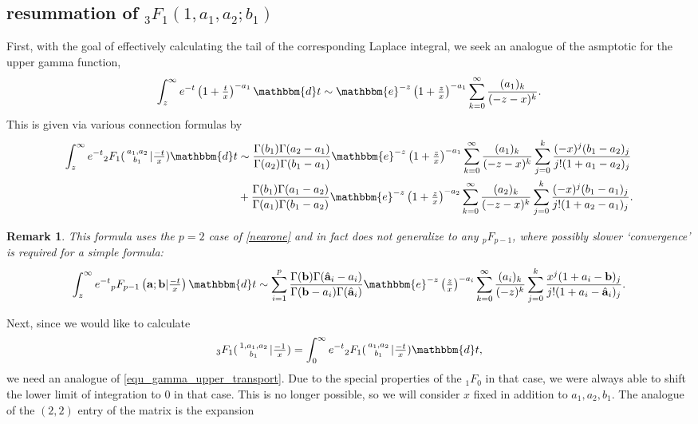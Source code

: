 \documentclass[12pt]{article}
\newcommand{\ee}[0] {\mathbbm{e}}
\newcommand{\dd}[0] {\mathbbm{d}}
\numberwithin{equation}{section}
\newtheorem{remark}[theorem]{Remark}
\newcommand{\FFs}[6] {{}_{#1}{#2}_{#3} ( \begin{smallmatrix} #4 \\ #5 \end{smallmatrix} | {#6}  )}
\newcommand{\FFf}[5] {{}_{#1}{#2}_{#3} \left(#4 | {#5} \right)}
\newcommand{\bfa}[0] {\mathbf{a}}
\newcommand{\bfb}[0] {\mathbf{b}}
\begin{document}
\subsection{resummation of ${}_3 F_1(1,a_1,a_2;b_1)$}
First, with the goal of effectively calculating the tail of the corresponding Laplace integral, we seek an analogue of the asmptotic for the upper gamma function,
\begin{equation*}
\int_{z}^{\infty} e^{-t} \left(1+\tfrac{t}{x}\right)^{-a_1} \dd t \sim \ee^{-z} \left(1+\tfrac{z}{x}\right)^{-a_1} \sum_{k=0}^{\infty} \frac{(a_1)_k}{(-z-x)^k} \text{.}
\end{equation*}
This is given via various connection formulas by
\begin{equation}
\label{equ_3f1_int_tail}
\begin{alignedat}{3}
\int_{z}^{\infty} e^{-t} \FFs{2}{F}{1}{a_1,a_2}{b_1}{\tfrac{-t}{x}} \dd t &\sim \frac{\Gamma(b_1)\Gamma(a_2-a_1)}{\Gamma(a_2)\Gamma(b_1-a_1)}\ee^{-z} \left(1+\tfrac{z}{x}\right)^{-a_1} \sum_{k=0}^{\infty} \frac{(a_1)_k}{(-z-x)^k} \sum_{j=0}^{k} \frac{(-x)^j(b_1-a_2)_j}{j!(1+a_1-a_2)_j}\\
&+\frac{\Gamma(b_1)\Gamma(a_1-a_2)}{\Gamma(a_1)\Gamma(b_1-a_2)}\ee^{-z} \left(1+\tfrac{z}{x}\right)^{-a_2} \sum_{k=0}^{\infty} \frac{(a_2)_k}{(-z-x)^k} \sum_{j=0}^{k} \frac{(-x)^j(b_1-a_1)_j}{j!(1+a_2-a_1)_j} \text{.}
\end{alignedat}
\end{equation}
\begin{remark}
This formula uses the $p=2$ case of \eqref{nearone} and in fact does not generalize to any ${}_p F_{p-1}$, where possibly slower `convergence' is required for a simple formula:
\begin{equation*}
\int_{z}^{\infty} e^{-t} \FFf{p}{F}{p-1}{\bfa; \bfb}{\tfrac{-t}{x}}  \dd t \sim \sum_{i=1}^{p} \frac{\Gamma(\mathbf{b}) \Gamma(\hat{\mathbf{a}}_i-a_i)}{\Gamma(\mathbf{b}-a_i) \Gamma(\hat{\mathbf{a}}_i)} \ee^{-z} \left(\tfrac{z}{x}\right)^{-a_i} \sum_{k=0}^{\infty} \frac{(a_i)_k}{(-z)^k} \sum_{j=0}^{k} \frac{x^j(1+a_i-\mathbf{b})_j}{j!(1+a_i-\hat{\mathbf{a}}_i)_j}\text{.}
\end{equation*}
\end{remark}
Next, since we would like to calculate
\begin{equation*}
\FFs{3}{F}{1}{1,a_1,a_2}{b_1}{\tfrac{-1}{x}} = \int_{0}^{\infty} e^{-t} \FFs{2}{F}{1}{a_1,a_2}{b_1}{\tfrac{-t}{x}} \dd t\text{,}
\end{equation*}
we need an analogue of \eqref{equ_gamma_upper_transport}. Due to the special properties of the ${}_1 F_{0}$ in that case, we were always able to shift the lower limit of integration to $0$ in that case. This is no longer possible, so we will consider $x$ fixed in addition to $a_1,a_2,b_1$. The analogue of the $(2,2)$ entry of the matrix is the expansion
\end{document}
